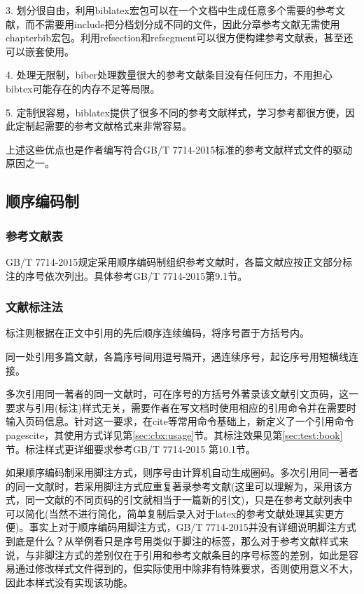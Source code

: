 3. 划分很自由，利用biblatex宏包可以在一个文档中生成任意多个需要的参考文献，而不需要用include把分档划分成不同的文件，因此分章参考文献无需使用chapterbib宏包。利用refsection和refsegment可以很方便构建参考文献表，甚至还可以嵌套使用。

4. 处理无限制，biber处理数量很大的参考文献条目没有任何压力，不用担心bibtex可能存在的内存不足等局限。

5. 定制很容易，biblatex提供了很多不同的参考文献样式，学习参考都很方便，因此定制起需要的参考文献格式来非常容易。

上述这些优点也是作者编写符合GB/T 7714-2015标准的参考文献样式文件的驱动原因之一。

\subsection{顺序编码制}

\subsubsection{参考文献表}

GB/T 7714-2015规定采用顺序编码制组织参考文献时，各篇文献应按正文部分标注的序号依次列出。具体参考GB/T 7714-2015第9.1节。

\subsubsection{文献标注法}
标注则根据在正文中引用的先后顺序连续编码，将序号置于方括号内。

同一处引用多篇文献，各篇序号间用逗号隔开，遇连续序号，起讫序号用短横线连接。

多次引用同一著者的同一文献时，可在序号的方括号外著录该文献引文页码，这一要求与引用(标注)样式无关，需要作者在写文档时使用相应的引用命令并在需要时输入页码信息。针对这一要求，在cite等常用命令基础上，新定义了一个引用命令pagescite，其使用方式详见第\ref{sec:cbx:usage}节。其标注效果见第\ref{sec:test:book}节。标注样式更详细要求参考GB/T 7714-2015 第10.1节。

如果顺序编码制采用脚注方式，则序号由计算机自动生成圈码。多次引用同一著者的同一文献时，若采用脚注方式应重复著录参考文献(这里可以理解为，采用该方式，同一文献的不同页码的引文就相当于一篇新的引文)，只是在参考文献列表中可以简化(当然不进行简化，简单复制后录入对于latex的参考文献处理其实更方便)。事实上对于顺序编码用脚注方式，GB/T 7714-2015并没有详细说明脚注方式到底是什么？从举例看只是序号用类似于脚注的标签，那么对于参考文献样式来说，与非脚注方式的差别仅在于引用和参考文献条目的序号标签的差别，如此是容易通过修改样式文件得到的，但实际使用中除非有特殊要求，否则使用意义不大，因此本样式没有实现该功能。

